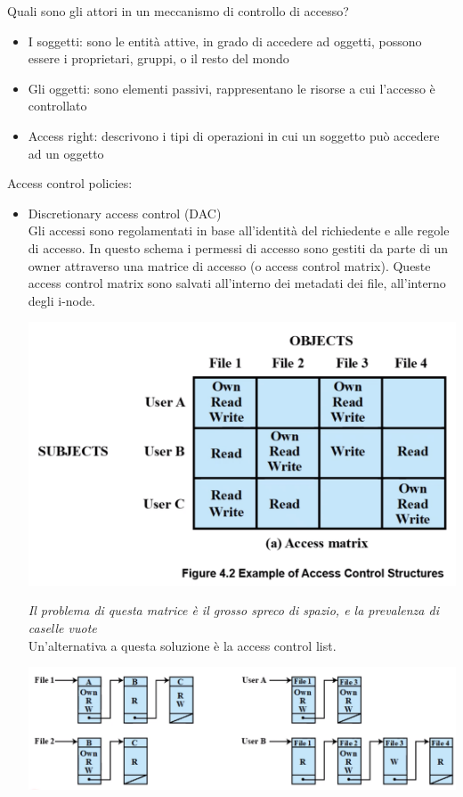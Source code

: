 \documentclass[11pt, oneside]{article}   	%
\begin{document}
Quali sono gli attori in un meccanismo di controllo di accesso?
\begin{itemize}
\item I soggetti: sono le entità attive, in grado di accedere ad oggetti, possono essere i proprietari, gruppi, o il resto del mondo
\item Gli oggetti: sono elementi passivi, rappresentano le risorse a cui l'accesso è controllato
\item Access right: descrivono i tipi di operazioni in cui un soggetto può accedere ad un oggetto
\end{itemize}
Access control policies:
\begin{itemize}
\item Discretionary access control (DAC)\\
Gli accessi sono regolamentati in base all'identità del richiedente e alle regole di accesso.
In questo schema i permessi di accesso sono gestiti da parte di un owner attraverso una matrice di accesso (o access control matrix). Queste access control matrix sono salvati all'interno dei metadati dei file, all'interno degli i-node.
 \begin{center}
\includegraphics[scale=0.5]{mac}
\end{center}
\emph{Il problema di questa matrice è il grosso spreco di spazio, e la prevalenza di caselle vuote}\\
Un'alternativa a questa soluzione è la access control list.
 \begin{center}
\includegraphics[scale=0.5]{acl}

\end{center}
\end{itemize}
\end{document}
